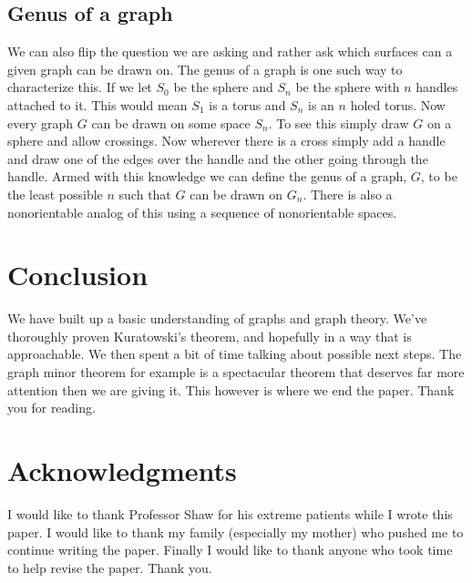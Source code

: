 \documentclass{article}
\begin{document}
\subsection{Genus of a graph}

We can also flip the question we are asking and rather ask which surfaces can a given graph can be drawn on. The genus of a graph is one such way to characterize this. If we let $S_0$ be the sphere and $S_n$ be the sphere with $n$ handles attached to it. This would mean $S_1$ is a torus and $S_n$ is an $n$ holed torus. Now every graph $G$ can be drawn on some space $S_n$. To see this simply draw $G$ on a sphere and allow crossings. Now wherever there is a cross simply add a handle and draw one of the edges over the handle and the other going through the handle. Armed with this knowledge we can define the genus of a graph, $G$, to be the least possible $n$ such that $G$ can be drawn on $G_n$. There is also a nonorientable analog of this using a sequence of nonorientable spaces.

\section{Conclusion}
We have built up a basic understanding of graphs and graph theory. We've thoroughly proven Kuratowski's theorem, and hopefully in a way that is approachable. We then spent a bit of time talking about possible next steps. The graph minor theorem for example is a spectacular theorem that deserves far more attention then we are giving it. This however is where we end the paper. Thank you for reading. %

\section{Acknowledgments}
I would like to thank Professor Shaw for his extreme patients while I wrote this paper. I would like to thank my family (especially my mother) who pushed me to continue writing the paper. Finally I would like to thank anyone who took time to help revise the paper. Thank you.
\end{document}
